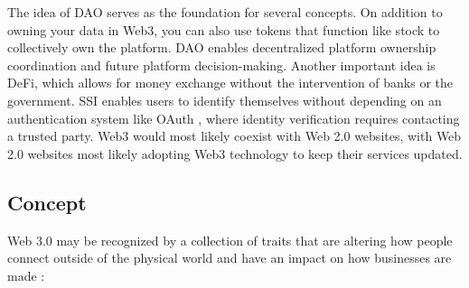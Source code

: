 \vspace{.5cm}

The idea of \ac{DAO} serves as the foundation for several concepts. On addition to owning your data in Web3, you can also use tokens that function like stock to collectively own the platform. \ac{DAO} enables decentralized platform ownership coordination and future platform decision-making. Another important idea is \ac{DeFi}, which allows for money exchange without the intervention of banks or the government. \ac{SSI} enables users to identify themselves without depending on an authentication system like OAuth \cite{oauth}, where identity verification requires contacting a trusted party. Web3 would most likely coexist with Web 2.0 websites, with Web 2.0 websites most likely adopting Web3 technology to keep their services updated.

\subsection{Concept}

Web 3.0 may be recognized by a collection of traits that are altering how people connect outside of the physical world and have an impact on how businesses are made \cite{concept}: 

\vspace{.5cm}

